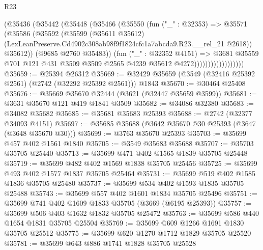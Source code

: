 \begin{lexlean}{R23}
\begin{coremodule}
                            (@35436
                              (@35442
                                (@35448
                                  (@35466
                                    (@35550
                                      (fun ("_" : @32353) =>
                                      @35571
                                        (@35586
                                          (@35592
                                            (@35599
                                              (@35611 @35612)
                                              (LexLeanPreserve.Cd4902c308ab98f9f1824cfc1a7abcda9.R23.__rel_21
                                                @2618))
                                            @35612))
                                        (@9685 @2760 @35483))
                                      (fun ("_" : @32352 @4151) =>
                                      @3681
                                        @35559
                                        @701
                                        @121
                                        @431
                                        @3509
                                        @3509
                                        @2565
                                        @4239
                                        @35612
                                        @4272))))))))))))))))))
@35659 := @25394 @26312
@35669 := @32429 @35659 (@3549 (@32416 @25392 @2561) (@2742 (@32292 @25392 @2561))) @1843
@35670 := @30464 @25408
@35676 := @35669 @35670 @32444 (@3621 (@32447 @35659 @3599))
@35681 := @3631 @35670 @121 @419 @1841 @3509
@35682 := @34086 @32380
@35683 := @34082 @35682
@35685 := @35681 @35683 @25393
@35688 := @2742 (@32377 @34093 @4151)
@35697 := @35685 @35688 (@3642 @35670 @30 @25393 (@3647 (@3648 @35670 @30)))
@35699 := @3763 @35670 @25393
@35703 := @35699 @457 @402 @1561 @1840
@35705 := @3549 @35683 @35688
@35707 := @35703 @35705 @25440
@35713 := @35699 @471 @402 @1565 @1839 @35705 @25448
@35719 := @35699 @482 @402 @1569 @1838 @35705 @25456
@35725 := @35699 @493 @402 @1577 @1837 @35705 @25464
@35731 := @35699 @519 @402 @1585 @1836 @35705 @25480
@35737 := @35699 @534 @402 @1593 @1835 @35705 @25488
@35743 := @35699 @557 @402 @1601 @1834 @35705 @25496
@35751 := @35699 @741 @402 @1609 @1833 @35705 (@3669 (@6195 @25393))
@35757 := @35699 @506 @403 @1632 @1832 @35705 @25472
@35763 := @35699 @586 @440 @1654 @1831 @35705 @25504
@35769 := @35699 @609 @1266 @1691 @1830 @35705 @25512
@35775 := @35699 @620 @1270 @1712 @1829 @35705 @25520
@35781 := @35699 @643 @886 @1741 @1828 @35705 @25528

\end{coremodule}
\end{lexlean}
